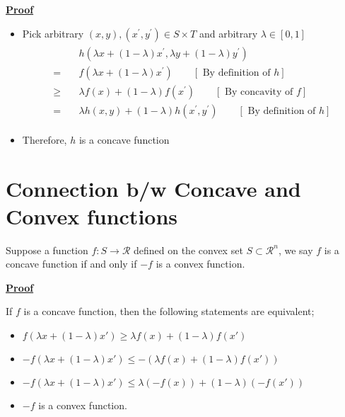 \documentclass[12pt,a4paper]{article}
\begin{document}
\underline{\textbf{Proof}}
\begin{itemize}
    \item Pick arbitrary \((x, y),\left(x^{\prime}, y^{\prime}\right) \in S \times T\) and arbitrary \(\lambda \in[0,1]\)
    \begin{align*}
    \begin{aligned}
    & h\left(\lambda x+(1-\lambda) x^{\prime}, \lambda y+(1-\lambda) y^{\prime}\right) \\
    =\quad & f\left(\lambda x+(1-\lambda) x^{\prime}\right) \qquad{[\text { By definition of } h] } \\
    \geq \quad & \lambda f(x)+(1-\lambda) f\left(x^{\prime}\right) \qquad [\text{ By concavity of  }f]\\
    = \ \ \  &\lambda h(x, y)+(1-\lambda) h\left(x^{\prime}, y^{\prime}\right) \qquad 
    [\text{ By definition of } h] 
    \end{aligned}
    \end{align*}
   \item Therefore, \(h\) is a concave function
\end{itemize}
\section{Connection b/w Concave and Convex functions}
Suppose a function \(f: S \rightarrow \mathcal{R}\) defined on the convex set \(S \subset \mathcal{R}^n\), we say \(f\) is a concave function if and only if \(-f\) is a convex function.

\underline{\textbf{Proof}}

If \(f\) is a concave function, then the following statements are equivalent; 
\begin{itemize}
    \item \(f(\lambda x + (1 -\lambda)x') \geq \lambda f(x) + (1-\lambda)f(x')\) 
    \item \(-f(\lambda x + (1 -\lambda)x') \leq -(\lambda f(x) + (1-\lambda)f(x'))\) 
    \item \(-f(\lambda x + (1 -\lambda)x') \leq \lambda (-f(x)) + (1-\lambda)(-f(x'))\)
    \item \(-f\) is a convex function.   
\end{itemize}
\end{document}
